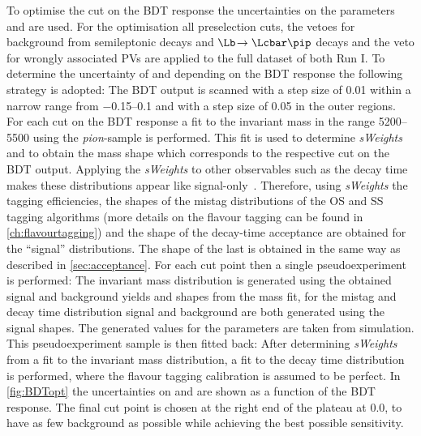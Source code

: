 To optimise the cut on the \ac{BDT} response the uncertainties on the \CP parameters \Sf and \Sfbar are used.
For the optimisation all preselection cuts, the vetoes for background from semileptonic decays and $\Lb\!\to\Lcbar\pip$ decays and the veto for wrongly associated \ac{PV}s are applied to the full dataset of both Run I.
To determine the uncertainty of \Sf and \Sfbar depending on the \ac{BDT} response the following strategy is adopted:
The \ac{BDT} output is scanned with a step size of \num{0.01} within a narrow range from \numrange{-0.15}{0.1} and with a step size of \num{0.05} in the outer regions.
For each cut on the \ac{BDT} response a fit to the invariant \Bz mass in the range \SIrange[per-mode=symbol]{5200}{5500}{\MeVcc} using the \emph{pion}-sample is performed.
This fit is used to determine \emph{sWeights}~\cite{Pivk:2004ty} and to obtain the mass shape which corresponds to the respective cut on the \ac{BDT} output.
Applying the \emph{sWeights} to other observables such as the decay time makes these distributions appear like signal-only~\cite{2009arXiv0905.0724X}.
Therefore, using \emph{sWeights} the tagging efficiencies, the shapes of the mistag distributions of the OS and SS tagging algorithms (more details on the flavour tagging can be found in \cref{ch:flavourtagging}) and the shape of the decay-time acceptance are obtained for the \enquote{signal} distributions.
The shape of the last is obtained in the same way as described in \cref{sec:acceptance}.
For each cut point then a single pseudoexperiment is performed: The invariant mass distribution is generated using the obtained signal and background yields and shapes from the mass fit, for the mistag and decay time distribution signal and background are both generated using the signal shapes.
The generated values for the \CP parameters are taken from simulation.
This pseudoexperiment sample is then fitted back: After determining \emph{sWeights} from a fit to the invariant \Bz mass distribution, a \CP fit to the decay time distribution is performed, where the flavour tagging calibration is assumed to be perfect.
In \cref{fig:BDTopt} the uncertainties on \Sf and \Sfbar are shown as a function of the \ac{BDT} response.
The final cut point is chosen at the right end of the plateau at \num{0.0}, to have as few background as possible while achieving the best possible sensitivity.
